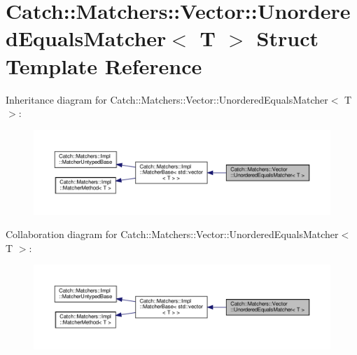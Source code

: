 \hypertarget{structCatch_1_1Matchers_1_1Vector_1_1UnorderedEqualsMatcher}{}\section{Catch\+:\+:Matchers\+:\+:Vector\+:\+:Unordered\+Equals\+Matcher$<$ T $>$ Struct Template Reference}
\label{structCatch_1_1Matchers_1_1Vector_1_1UnorderedEqualsMatcher}


Inheritance diagram for Catch\+:\+:Matchers\+:\+:Vector\+:\+:Unordered\+Equals\+Matcher$<$ T $>$\+:
\nopagebreak
\begin{figure}[H]
\begin{center}
\leavevmode
\includegraphics[width=350pt]{structCatch_1_1Matchers_1_1Vector_1_1UnorderedEqualsMatcher__inherit__graph}
\end{center}
\end{figure}


Collaboration diagram for Catch\+:\+:Matchers\+:\+:Vector\+:\+:Unordered\+Equals\+Matcher$<$ T $>$\+:
\nopagebreak
\begin{figure}[H]
\begin{center}
\leavevmode
\includegraphics[width=350pt]{structCatch_1_1Matchers_1_1Vector_1_1UnorderedEqualsMatcher__coll__graph}
\end{center}
\end{figure}
